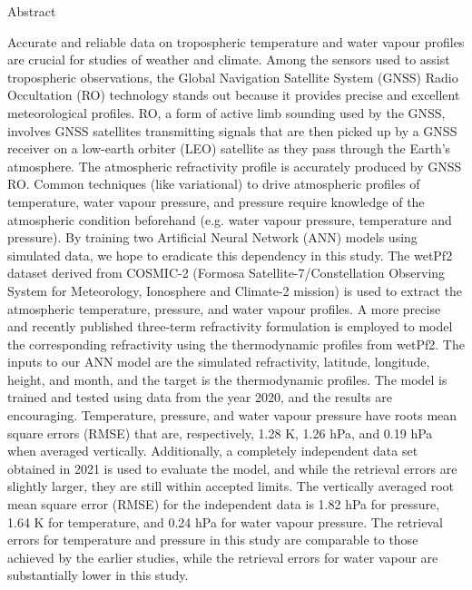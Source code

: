 \documentclass[a4paper,12pt,twoside]{article}
\begin{document}
\newpage
\begin{center}
\begin{LARGE}
Abstract\\
\end{LARGE}
 \begin{center}
 	\justifying
	Accurate and reliable data on tropospheric temperature and water vapour profiles are crucial for studies of weather and climate. Among the sensors used to assist tropospheric observations, the Global Navigation Satellite System (GNSS) Radio Occultation (RO) technology stands out because it provides precise and excellent meteorological profiles. RO, a form of active limb sounding used by the GNSS, involves GNSS satellites transmitting signals that are then picked up by a GNSS receiver on a low-earth orbiter (LEO) satellite as they pass through the Earth's atmosphere. The atmospheric refractivity profile is accurately produced by GNSS RO. Common techniques (like variational) to drive atmospheric profiles of temperature, water vapour pressure, and pressure require knowledge of the atmospheric condition beforehand (e.g. water vapour pressure, temperature and pressure). By training two Artificial Neural Network (ANN) models using simulated data, we hope to eradicate this dependency in this study. The wetPf2 dataset derived from COSMIC-2 (Formosa Satellite-7/Constellation Observing System for Meteorology, Ionosphere and Climate-2 mission) is used to extract the atmospheric temperature, pressure, and water vapour profiles. A more precise and recently published three-term refractivity formulation is employed to model the corresponding refractivity using the thermodynamic profiles from wetPf2. The inputs to our ANN model are the simulated refractivity, latitude, longitude, height, and month, and the target is the thermodynamic profiles. The model is trained and tested using data from the year 2020, and the results are encouraging. Temperature, pressure, and water vapour pressure have roots mean square errors (RMSE) that are, respectively, 1.28 K, 1.26 hPa, and 0.19 hPa when averaged vertically. Additionally, a completely independent data set obtained in 2021 is used to evaluate the model, and while the retrieval errors are slightly larger, they are still within accepted limits. The vertically averaged root mean square error (RMSE) for the independent data is 1.82 hPa for pressure, 1.64 K for temperature, and 0.24 hPa for water vapour pressure. The retrieval errors for temperature and pressure in this study are comparable to those  achieved by the earlier studies, while the retrieval errors for water vapour are substantially lower in this study. \\
\end{center}
\end{center}
\end{document}
